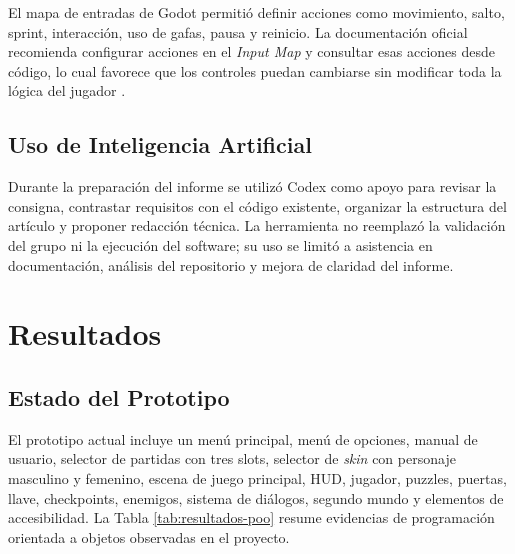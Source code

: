 \documentclass[conference]{IEEEtran}
\begin{document}
El mapa de entradas de Godot permitió definir acciones como movimiento, salto, sprint, interacción, uso de gafas, pausa y reinicio. La documentación oficial recomienda configurar acciones en el \textit{Input Map} y consultar esas acciones desde código, lo cual favorece que los controles puedan cambiarse sin modificar toda la lógica del jugador \cite{godotinput}.

\subsection{Uso de Inteligencia Artificial}
Durante la preparación del informe se utilizó Codex como apoyo para revisar la consigna, contrastar requisitos con el código existente, organizar la estructura del artículo y proponer redacción técnica. La herramienta no reemplazó la validación del grupo ni la ejecución del software; su uso se limitó a asistencia en documentación, análisis del repositorio y mejora de claridad del informe.

\section{Resultados}
\subsection{Estado del Prototipo}
El prototipo actual incluye un menú principal, menú de opciones, manual de usuario, selector de partidas con tres slots, selector de \textit{skin} con personaje masculino y femenino, escena de juego principal, HUD, jugador, puzzles, puertas, llave, checkpoints, enemigos, sistema de diálogos, segundo mundo y elementos de accesibilidad. La Tabla \ref{tab:resultados-poo} resume evidencias de programación orientada a objetos observadas en el proyecto.
\end{document}
